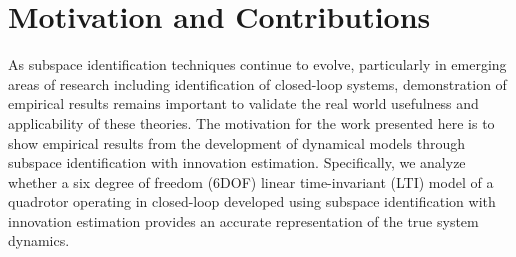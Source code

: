 \section{Motivation and Contributions}
As subspace identification techniques continue to evolve, particularly in emerging areas of research including identification of closed-loop systems, demonstration of empirical results remains important to validate the real world usefulness and applicability of these theories. The motivation for the work presented here is to show empirical results from the development of dynamical models through subspace identification with innovation estimation. Specifically, we analyze whether a six degree of freedom (6DOF) linear time-invariant (LTI) model of a quadrotor operating in closed-loop developed using subspace identification with innovation estimation provides an accurate representation of the true system dynamics.




